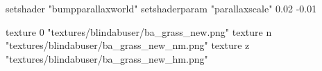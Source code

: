 	setshader "bumpparallaxworld"
	setshaderparam "parallaxscale" 0.02 -0.01

    texture 0 "textures/blindabuser/ba_grass_new.png"
    texture n "textures/blindabuser/ba_grass_new_nm.png"
    texture z "textures/blindabuser/ba_grass_new_hm.png"
